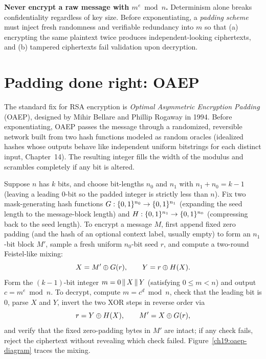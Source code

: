 \begin{trapbox}
\textbf{Never encrypt a raw message with $m^e\bmod n$.} Determinism alone breaks confidentiality regardless of key size. Before exponentiating, a \emph{padding scheme} must inject fresh randomness and verifiable redundancy into $m$ so that (a) encrypting the same plaintext twice produces independent-looking ciphertexts, and (b) tampered ciphertexts fail validation upon decryption.
\end{trapbox}

\section{Padding done right: OAEP}
\label{ch19:oaep}

The standard fix for RSA encryption is \emph{Optimal Asymmetric Encryption Padding} (OAEP), designed by Mihir Bellare and Phillip Rogaway in 1994. Before exponentiating, OAEP passes the message through a randomized, reversible network built from two hash functions modeled as random oracles (idealized hashes whose outputs behave like independent uniform bitstrings for each distinct input, Chapter~14). The resulting integer fills the width of the modulus and scrambles completely if any bit is altered.

Suppose $n$ has $k$ bits, and choose bit-lengths $n_0$ and $n_1$ with $n_1 + n_0 = k - 1$ (leaving a leading $0$-bit so the padded integer is strictly less than $n$). Fix two mask-generating hash functions $G : \{0,1\}^{n_0} \to \{0,1\}^{n_1}$ (expanding the seed length to the message-block length) and $H : \{0,1\}^{n_1} \to \{0,1\}^{n_0}$ (compressing back to the seed length). To encrypt a message $M$, first append fixed zero padding (and the hash of an optional context label, usually empty) to form an $n_1$-bit block $M'$, sample a fresh uniform $n_0$-bit seed $r$, and compute a two-round Feistel-like mixing:
\[
  X = M' \oplus G(r), \qquad Y = r \oplus H(X).
\]
Form the $(k-1)$-bit integer $m = 0 \,\|\, X\,\|\, Y$ (satisfying $0 \le m < n$) and output $c = m^e\bmod n$. To decrypt, compute $m = c^d \bmod n$, check that the leading bit is $0$, parse $X$ and $Y$, invert the two XOR steps in reverse order via
\[
  r = Y\oplus H(X), \qquad M' = X\oplus G(r),
\]
and verify that the fixed zero-padding bytes in $M'$ are intact; if any check fails, reject the ciphertext without revealing which check failed. Figure~\ref{ch19:oaep-diagram} traces the mixing.

